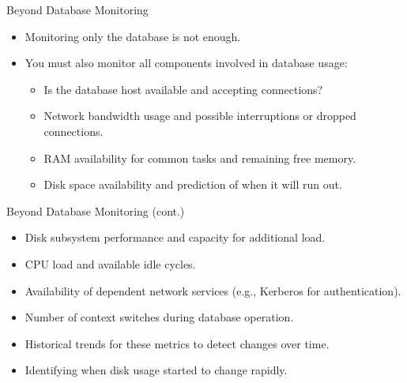 \documentclass[aspectratio=169]{beamer}
\begin{document}
\begin{frame}{Beyond Database Monitoring}
\begin{itemize}
    \item Monitoring only the database is not enough.
    \item You must also monitor all components involved in database usage:
    \begin{itemize}
        \item Is the database host available and accepting connections?
        \item Network bandwidth usage and possible interruptions or dropped connections.
        \item RAM availability for common tasks and remaining free memory.
        \item Disk space availability and prediction of when it will run out.
    \end{itemize}
\end{itemize}
\end{frame}

\begin{frame}{Beyond Database Monitoring (cont.)}
\begin{itemize}
    \item Disk subsystem performance and capacity for additional load.
    \item CPU load and available idle cycles.
    \item Availability of dependent network services (e.g., Kerberos for authentication).
    \item Number of context switches during database operation.
    \item Historical trends for these metrics to detect changes over time.
    \item Identifying when disk usage started to change rapidly.
\end{itemize}
\end{frame}
\end{document}
